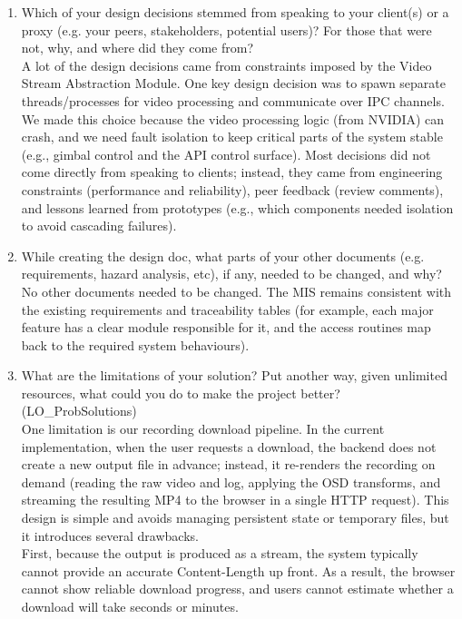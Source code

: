 \documentclass[12pt, titlepage]{article}
\begin{document}
\begin{enumerate}
  \item Which of your design decisions stemmed from speaking to your client(s) or a
        proxy (e.g. your peers, stakeholders, potential users)? For those that were
        not, why, and where did they come from? \\[2mm]
        A lot of the design decisions came from constraints imposed by the Video Stream Abstraction Module. One key design decision was to spawn separate threads/processes for video processing and communicate over IPC channels. We made this choice because the video processing logic (from NVIDIA) can crash, and we need fault isolation to keep critical parts of the system stable (e.g., gimbal control and the API control surface). Most decisions did not come directly from speaking to clients; instead, they came from engineering constraints (performance and reliability), peer feedback (review comments), and lessons learned from prototypes (e.g., which components needed isolation to avoid cascading failures).

  \item While creating the design doc, what parts of your other documents (e.g.
        requirements, hazard analysis, etc), if any, needed to be changed, and why? \\[2mm]
        No other documents needed to be changed. The MIS remains consistent with the existing requirements and traceability tables (for example, each major feature has a clear module responsible for it, and the access routines map back to the required system behaviours).

  \item What are the limitations of your solution? Put another way, given unlimited
        resources, what could you do to make the project better? (LO\_ProbSolutions) \\[2mm]
        One limitation is our recording download pipeline. In the current implementation, when the
        user requests a download, the backend does not create a new output file in advance; instead,
        it re-renders the recording on demand (reading the raw video and log, applying the OSD
        transforms, and streaming the resulting MP4 to the browser in a single HTTP request). This
        design is simple and avoids managing persistent state or temporary files, but it introduces
        several drawbacks.\\[2mm]

        First, because the output is produced as a stream, the system typically cannot
        provide an accurate Content-Length up front. As a result, the browser cannot
        show reliable download progress, and users cannot estimate whether a download
        will take seconds or minutes.\\[2mm]


\end{enumerate}
\end{document}
